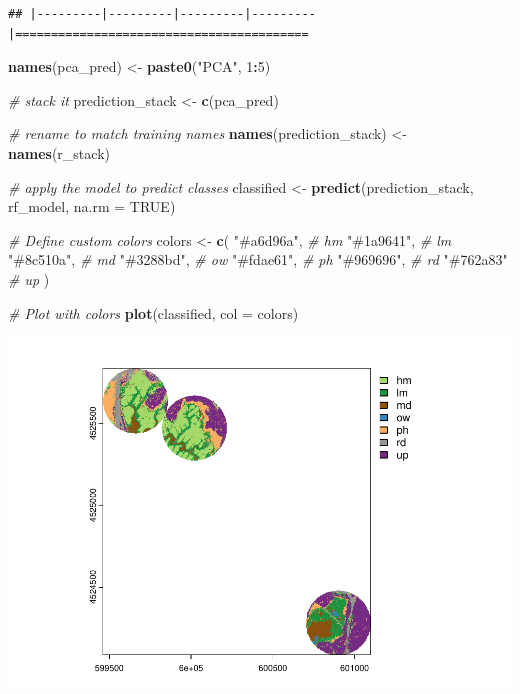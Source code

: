 \documentclass[
]{article}
\newenvironment{Shaded}{\begin{snugshade}}{\end{snugshade}}
\newcommand{\AttributeTok}[1]{\textcolor[rgb]{0.13,0.29,0.53}{#1}}
\newcommand{\CommentTok}[1]{\textcolor[rgb]{0.56,0.35,0.01}{\textit{#1}}}
\newcommand{\ConstantTok}[1]{\textcolor[rgb]{0.56,0.35,0.01}{#1}}
\newcommand{\DecValTok}[1]{\textcolor[rgb]{0.00,0.00,0.81}{#1}}
\newcommand{\FunctionTok}[1]{\textcolor[rgb]{0.13,0.29,0.53}{\textbf{#1}}}
\newcommand{\NormalTok}[1]{#1}
\newcommand{\OtherTok}[1]{\textcolor[rgb]{0.56,0.35,0.01}{#1}}
\newcommand{\SpecialCharTok}[1]{\textcolor[rgb]{0.81,0.36,0.00}{\textbf{#1}}}
\newcommand{\StringTok}[1]{\textcolor[rgb]{0.31,0.60,0.02}{#1}}
\begin{document}
\begin{verbatim}
## |---------|---------|---------|---------|=========================================                                          
\end{verbatim}

\begin{Shaded}
\begin{Highlighting}[]
\FunctionTok{names}\NormalTok{(pca\_pred) }\OtherTok{\textless{}{-}} \FunctionTok{paste0}\NormalTok{(}\StringTok{"PCA"}\NormalTok{, }\DecValTok{1}\SpecialCharTok{:}\DecValTok{5}\NormalTok{)}

\CommentTok{\# stack it}
\NormalTok{prediction\_stack }\OtherTok{\textless{}{-}} \FunctionTok{c}\NormalTok{(pca\_pred)}

\CommentTok{\# rename to match training names}
\FunctionTok{names}\NormalTok{(prediction\_stack) }\OtherTok{\textless{}{-}} \FunctionTok{names}\NormalTok{(r\_stack)}

\CommentTok{\# apply the model to predict classes}
\NormalTok{classified }\OtherTok{\textless{}{-}} \FunctionTok{predict}\NormalTok{(prediction\_stack, rf\_model, }\AttributeTok{na.rm =} \ConstantTok{TRUE}\NormalTok{)}

\CommentTok{\# Define custom colors}
\NormalTok{colors }\OtherTok{\textless{}{-}} \FunctionTok{c}\NormalTok{(}
  \StringTok{"\#a6d96a"}\NormalTok{,  }\CommentTok{\# hm  }
  \StringTok{"\#1a9641"}\NormalTok{,  }\CommentTok{\# lm  }
  \StringTok{"\#8c510a"}\NormalTok{,  }\CommentTok{\# md  }
  \StringTok{"\#3288bd"}\NormalTok{,  }\CommentTok{\# ow  }
  \StringTok{"\#fdae61"}\NormalTok{,  }\CommentTok{\# ph  }
  \StringTok{"\#969696"}\NormalTok{,  }\CommentTok{\# rd  }
  \StringTok{"\#762a83"}   \CommentTok{\# up  }
\NormalTok{)}



\CommentTok{\# Plot with colors}
\FunctionTok{plot}\NormalTok{(classified, }\AttributeTok{col =}\NormalTok{ colors)}
\end{Highlighting}
\end{Shaded}

\includegraphics{veg_model_new_class_files/figure-latex/unnamed-chunk-16-1.pdf}
\end{document}
